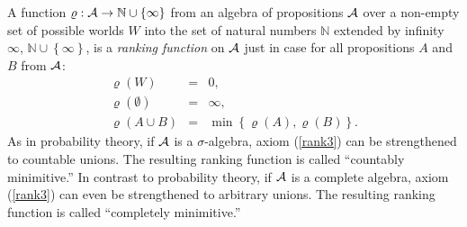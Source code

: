 
A function $\varrho:\begin{cal}A\end{cal}\rightarrow\mathbb{N}\cup\left\{\infty\right\}$ from an algebra of propositions $\cal A$ over a non-empty set of possible worlds $W$ into the set of natural numbers $\mathbb{N}$ extended by infinity $\infty$, $\mathbb{N}\cup\left\{\infty\right\}$, is a \emph{%
ranking function} on $\cal A$ just in case for %
all propositions $A$ and $B$ from $\cal A$:
\begin{eqnarray}
\varrho\left(W\right)&=&0,\label{rank1}\\
\varrho\left(\emptyset\right)&=&\infty,\label{rank2}\\
\varrho\left(A\cup B\right)&=&\min\left\{\varrho\left(A\right),\varrho\left(B\right)\right\}.\label{rank3}
\end{eqnarray}
As in probability theory, if $\cal A$ is a $\sigma$-algebra, axiom (\ref{rank3}) can be strengthened to countable unions. The resulting ranking function is called ``countably minimitive.'' In contrast to probability theory, if $\cal A$ is a complete algebra, axiom (\ref{rank3}) can even be strengthened to arbitrary unions. The resulting ranking function is called ``completely minimitive.''

